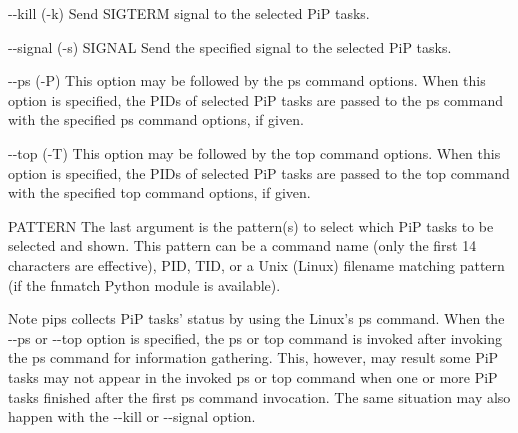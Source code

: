 \begin{DoxyItemize}
\item {\ttfamily -\/-\/kill} ({\ttfamily -\/k}) Send S\-I\-G\-T\-E\-R\-M signal to the selected Pi\-P tasks. \item {\ttfamily -\/-\/signal} ({\ttfamily -\/s}) {\ttfamily S\-I\-G\-N\-A\-L} Send the specified signal to the selected Pi\-P tasks. \item {\ttfamily -\/-\/ps} ({\ttfamily -\/\-P}) This option may be followed by the {\ttfamily ps} command options. When this option is specified, the P\-I\-Ds of selected Pi\-P tasks are passed to the {\ttfamily ps} command with the specified {\ttfamily ps} command options, if given. \item {\ttfamily -\/-\/top} ({\ttfamily -\/\-T}) This option may be followed by the {\ttfamily top} command options. When this option is specified, the P\-I\-Ds of selected Pi\-P tasks are passed to the {\ttfamily top} command with the specified {\ttfamily top} command options, if given. \item {\ttfamily P\-A\-T\-T\-E\-R\-N} The last argument is the pattern(s) to select which Pi\-P tasks to be selected and shown. This pattern can be a command name (only the first 14 characters are effective), P\-I\-D, T\-I\-D, or a Unix (Linux) filename matching pattern (if the fnmatch Python module is available). 
\end{DoxyItemize}
\begin{DoxyNote}{Note}
{\ttfamily pips} collects Pi\-P tasks' status by using the Linux's {\ttfamily ps} command. When the {\ttfamily -\/-\/ps} or {\ttfamily -\/-\/top} option is specified, the {\ttfamily ps} or {\ttfamily top} command is invoked after invoking the {\ttfamily ps} command for information gathering. This, however, may result some Pi\-P tasks may not appear in the invoked {\ttfamily ps} or {\ttfamily top} command when one or more Pi\-P tasks finished after the first {\ttfamily ps} command invocation. The same situation may also happen with the {\ttfamily -\/-\/kill} or -\/-\/signal option. 
\end{DoxyNote}
